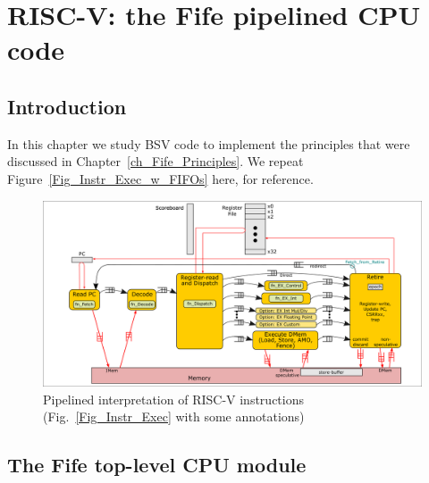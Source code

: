 

\chapter{RISC-V: the Fife pipelined CPU code}


\setcounter{page}{1}
\renewcommand{\thepage}{\arabic{chapter}-\arabic{page}}

\label{ch_Fife_code}


\section{Introduction}

In this chapter we study BSV code to implement the principles that
were discussed in Chapter~\ref{ch_Fife_Principles}.
We repeat Figure~\ref{Fig_Instr_Exec_w_FIFOs} here, for reference.
\begin{figure}[htbp]
  \centerline{\includegraphics[width=6in,angle=0]{Figures/Fig_Instr_Exec_w_FIFOs}}
  \caption{\label{Fig_Instr_Exec_w_FIFOs_2}Pipelined interpretation of RISC-V instructions (Fig.~\ref{Fig_Instr_Exec} with some annotations)}
\end{figure}


\section{The Fife top-level CPU module}

